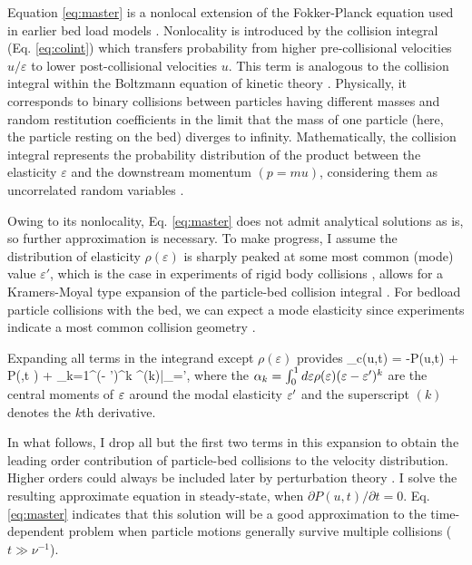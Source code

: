 Equation \ref{eq:master} is a nonlocal extension of the Fokker-Planck equation used in earlier bed load models \citep{Fan2014,Ancey2014}. 
Nonlocality is introduced by the collision integral (Eq. \ref{eq:colint}) which transfers probability from higher pre-collisional velocities $u/\varepsilon$ to lower post-collisional velocities $u$.
This term is analogous to the collision integral within the Boltzmann equation of kinetic theory \citep{Duderstadt1979, Brilliantov2004}. Physically, it corresponds to binary collisions between particles having different masses and random restitution coefficients \citep[cf.][]{Serero2015} in the limit that the mass of one particle (here, the particle resting on the bed) diverges to infinity.
Mathematically, the collision integral represents the probability distribution of the product between the elasticity $\varepsilon$ and the downstream momentum $(p = m u)$, considering them as uncorrelated random variables \citep[cf.][]{Feller1968}.


Owing to its nonlocality, Eq. \ref{eq:master} does not admit analytical solutions as is, so further approximation is necessary.
To make progress, I assume the distribution of elasticity $\rho(\varepsilon)$ is sharply peaked at some most common (mode) value $\varepsilon'$, which is the case in experiments of rigid body collisions \citep{Glielmo2014}, allows for a Kramers-Moyal type expansion of the particle-bed collision integral \citep{Gardiner1983}.
For bedload particle collisions with the bed, we can expect a mode elasticity since experiments indicate a most common collision geometry \citep[e.g.][]{Gordon1972,Martin2013}.

Expanding all terms in the integrand except $\rho(\varepsilon)$ provides
\be {}_c(u,t) = -P(u,t) + P\big(,t \big) + \sum_{k=1}^\infty {}(\ve - \ve')^k ^{(k)}\Big|_{\ve=\ve'},\label{eq:expansion}\ee
where the $\alpha_k = \int_0^1 d\varepsilon \rho(\varepsilon) (\varepsilon-\varepsilon')^k $ are the central moments of $\varepsilon$ around the modal elasticity $\varepsilon'$ and the superscript $(k)$ denotes the $k$th derivative.

In what follows, I drop all but the first two terms in this expansion to obtain the leading order contribution of particle-bed collisions to the velocity distribution.
Higher orders could always be included later by perturbation theory \citep{Morse1953}.
I solve the resulting approximate equation in steady-state, when $\partial P(u,t)/\partial t = 0$. Eq. \ref{eq:master} indicates that this solution will be a good approximation to the time-dependent problem when particle motions generally survive multiple collisions ($t\gg \nu^{-1}$).

